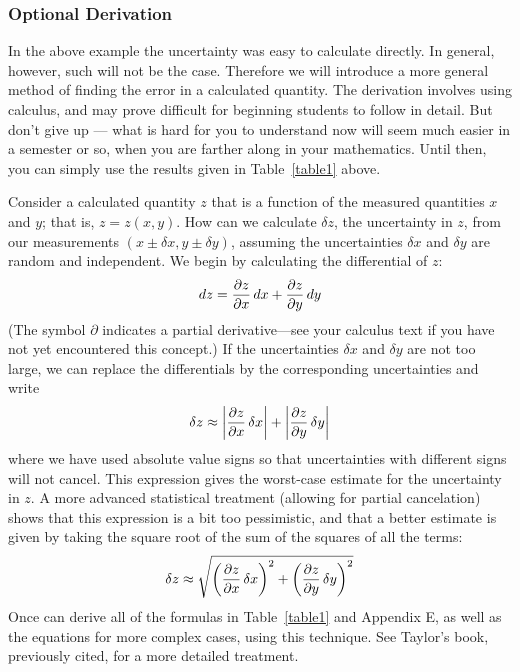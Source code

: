 \subsubsection*{Optional Derivation}
     In the above example the uncertainty was easy to calculate
directly.  In general, however, such will not be the case.
Therefore we will introduce a more general method of finding the
error in a calculated quantity.  The derivation involves using
calculus, and may prove difficult for beginning students to
follow in detail.  But don't give up --- what is hard for you to
understand now will seem much easier in a semester or so, when
you are farther along in your mathematics.  Until then, you can
simply use the results given in Table~\ref{table1} above.

     Consider a calculated quantity $z$ that is a function of the
measured quantities $x$ and $y$; that is, $z = z(x,y)$.  How can we
calculate $\delta z$, the uncertainty in $z$, from our measurements
$(x \pm \delta x, y \pm \delta y)$,
assuming the uncertainties $\delta x$ and $\delta y$ are random and
independent.  We begin by calculating the differential of $z$:
\[
dz = {{\partial z} \over {\partial x}} \, dx +
            {{\partial z} \over {\partial y}} \, dy
\]
(The symbol $\partial$ indicates a partial derivative---see your
calculus text if you have not yet encountered this concept.) If
the uncertainties $\delta x$ and $\delta y$ are not too large, we can
replace the differentials by the corresponding uncertainties and
write
\[
\delta z \approx \left|{{\partial z} \over {\partial x}} \, \delta x \right| +
            \left| {{\partial z} \over {\partial y}} \, \delta y \right|
\]
where we have used absolute value signs so that
uncertainties with different signs will not cancel.  This
expression gives the worst-case estimate for the uncertainty
in $z$.  A more advanced statistical treatment (allowing for partial cancelation) shows
that this expression is a bit too pessimistic, and that a better
estimate is given by taking the square root of the sum of the
squares of all the terms:
\[
\delta z \approx \sqrt{ \left({{\partial z} \over {\partial x}} \, \delta x
                 \right)^{2} + \left( {{\partial z} \over {\partial y}} \,
                 \delta y \right)^{2} }
\]
Once can derive all of the formulas in Table~\ref{table1} and Appendix E, as well as
the equations for more complex cases, using this technique.  See
Taylor's book, previously cited, for a more detailed treatment.

